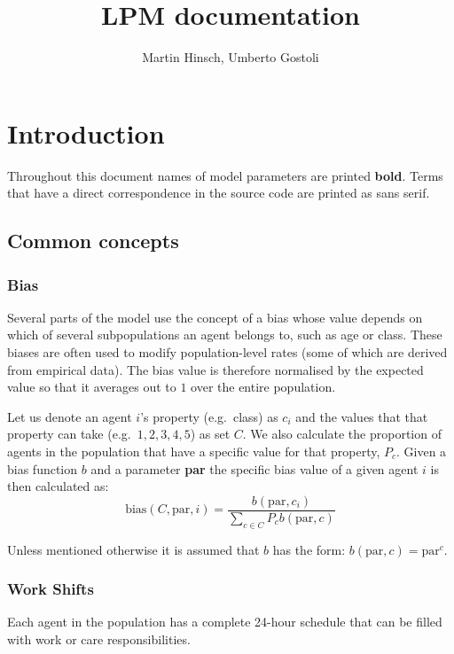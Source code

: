 \documentclass{article}
\title{LPM documentation }
\author{Martin Hinsch, Umberto Gostoli}
\newcommand{\marginnote}[1]{\protect\marginpar{\small\texttt{#1}}}
\begin{document}
\maketitle

\section{Introduction}

Throughout this document names of model parameters are printed \textbf{bold}. Terms that have a direct correspondence in the source code are printed as \textsf{sans serif}. 

\subsection{Common concepts}

\subsubsection*{Bias \marginnote{Utilities.jl}}\label{bias}

Several parts of the model use the concept of a bias whose value depends on which of several subpopulations an agent belongs to, such as age or class. These biases are often used to modify population-level rates (some of which are derived from empirical data). The bias value is therefore normalised by the expected value so that it averages out to $1$ over the entire population.

Let us denote an agent $i$'s property (e.g.~class) as $c_i$ and the values that that property can take (e.g.~$1,2,3,4,5$) as set $C$. We also calculate the proportion of agents in the population that have a specific value for that property, $P_c$. Given a bias function $b$ and a parameter \textbf{par} the specific bias value of a given agent $i$ is then calculated as:
\[
\textrm{bias}(C,\textrm{par},i) = \frac{b(\textrm{par}, c_i)}{\sum_{c \in C} P_c b(\textrm{par}, c)}
\]

Unless mentioned otherwise it is assumed that $b$ has the form: $b(\textrm{par}, c) = \textrm{par}^c$.

\subsubsection*{Work Shifts}\label{shifts}

Each agent in the population has a complete 24-hour schedule that can be filled with work or care responsibilities. 
\end{document}
